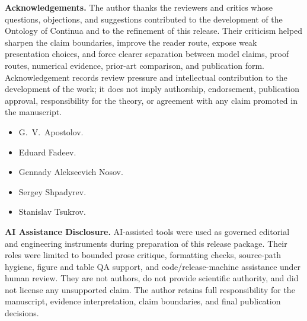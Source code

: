 \clearpage
\noindent\textbf{Acknowledgements.}
The author thanks the reviewers and critics whose questions, objections, and
suggestions contributed to the development of the Ontology of Continua and to
the refinement of this release. Their criticism helped sharpen the claim
boundaries, improve the reader route, expose weak presentation choices, and
force clearer separation between model claims, proof routes, numerical evidence,
prior-art comparison, and publication form. Acknowledgement records review
pressure and intellectual contribution to the development of the work; it does
not imply authorship, endorsement, publication approval, responsibility for the
theory, or agreement with any claim promoted in the manuscript.
\begin{itemize}
    \item G.~V.~Apostolov.
    \item Eduard Fadeev.
    \item Gennady Alekseevich Nosov.
    \item Sergey Shpadyrev.
    \item Stanislav Tsukrov.
\end{itemize}

\clearpage
\noindent\textbf{AI Assistance Disclosure.}
AI-assisted tools were used as governed editorial and engineering instruments during preparation of this release package. Their roles were limited to bounded prose critique, formatting checks, source-path hygiene, figure and table QA support, and code/release-machine assistance under human review. They are not authors, do not provide scientific authority, and did not license any unsupported claim. The author retains full responsibility for the manuscript, evidence interpretation, claim boundaries, and final publication decisions.

